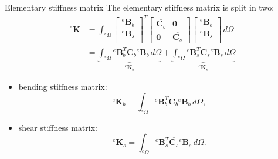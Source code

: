 \documentclass[aspectratio=169]{beamer}
\begin{document}
\begin{frame}{Elementary stiffness matrix}
  The elementary stiffness matrix is split in two:
  \begin{align*}
    {}^e\mathbf K & =\int_{{}^e\Omega} \left[
      \begin{array}{c}
        {}^e\mathbf B_b \\
        {}^e\mathbf B_s \\
      \end{array} \right]^T\begin{bmatrix}
                           \overline{\boldsymbol{C}_b} & \mathbf 0                   \\
                           \mathbf 0                   & \overline{\boldsymbol{C}_s}
                         \end{bmatrix}\left[
    \begin{array}{c}
        {}^e\mathbf B_b \\
        {}^e\mathbf B_s \\
      \end{array} \right] \, d\Omega                                                                                                                                                                                                                                             \\[5pt]
                  & =\underbrace{\int_{{}^e\Omega}{}^e\mathbf B_b^T\overline{\boldsymbol{C}_b}{}^e\mathbf B_b\, d\Omega}_\text{${}^e\mathbf K_b$}+\underbrace{\int_{{}^e\Omega}{}^e\mathbf B_s^T\overline{\boldsymbol{C}_s}{}^e\mathbf B_s\, d\Omega}_\text{${}^e\mathbf K_s$}
  \end{align*}
  \begin{block}{}
    \begin{itemize}
      \item bending stiffness matrix:
            $${}^e\mathbf K_b =\int_{{}^e\Omega}{}^e\mathbf B_b^T\overline{\boldsymbol{C}_b}{}^e\mathbf B_b\, d\Omega,$$
      \item shear stiffness matrix:
            $$ {}^e\mathbf K_s =\int_{{}^e\Omega}{}^e\mathbf B_s^T\overline{\boldsymbol{C}_s}{}^e\mathbf B_s\, d\Omega.$$
    \end{itemize}
  \end{block}
\end{frame}
\end{document}
